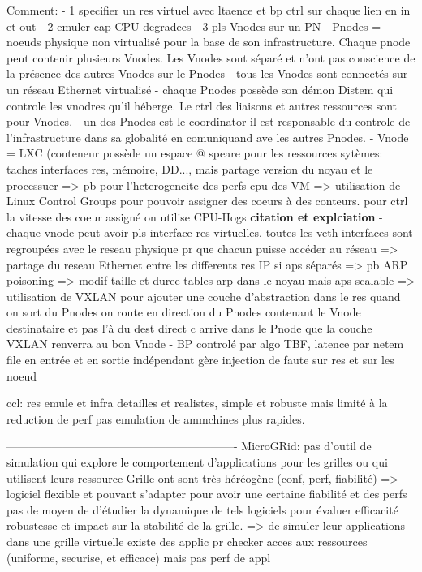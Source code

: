 Comment:
- 1 specifier un res virtuel avec ltaence et bp ctrl sur chaque lien en in et out
- 2 emuler cap CPU degradees
- 3 pls Vnodes sur un PN
- Pnodes = noeuds physique non virtualisé pour la base de son infrastructure. Chaque pnode peut contenir plusieurs Vnodes. Les Vnodes sont séparé et n'ont pas conscience de la présence des autres Vnodes sur le Pnodes
- tous les Vnodes sont connectés sur un réseau Ethernet virtualisé
- chaque Pnodes possède son démon Distem qui controle les vnodres qu'il héberge. Le ctrl des liaisons et autres ressources sont pour Vnodes.
- un des Pnodes est le coordinator il est responsable du controle de l'infrastructure dans sa globalité en comuniquand ave les autres Pnodes.
- Vnode = LXC (conteneur possède un espace @ speare pour les ressources sytèmes: taches interfaces res, mémoire, DD..., mais partage version du noyau et le processuer => pb pour l'heterogeneite des perfs cpu des VM => utilisation de Linux Control Groups pour pouvoir assigner des coeurs à des conteurs. pour ctrl la vitesse des coeur assigné on utilise CPU-Hogs \textbf{citation et explciation}
- chaque vnode peut avoir pls interface res virtuelles. toutes les veth interfaces sont regroupées avec le reseau physique pr que chacun puisse accéder au réseau => partage du reseau Ethernet entre les differents res IP si aps séparés => pb ARP poisoning => modif taille et duree tables arp dans le noyau mais aps scalable => utilisation de VXLAN pour ajouter une couche d'abstraction dans le res quand on sort du Pnodes on route en direction du Pnodes contenant le Vnode destinataire et pas l'à du dest direct c arrive dans le Pnode que la couche VXLAN renverra au bon Vnode
- BP controlé par algo TBF, latence par netem file en entrée et en sortie indépendant
gère injection de faute sur res et sur les noeud

ccl:
res emule et infra detailles et realistes, simple et robuste mais limité à la reduction de perf pas emulation de ammchines plus rapides.


-------------------------------------------------------------
MicroGRid:
pas d'outil de simulation qui explore le comportement d'applications pour les grilles ou qui utilisent leurs ressource
Grille ont sont très héréogène (conf, perf, fiabilité) => logiciel flexible et pouvant s'adapter pour avoir une certaine fiabilité et des perfs
pas de moyen de d'étudier la dynamique de tels logiciels pour évaluer efficacité robustesse et impact sur la stabilité de la grille.
=> de simuler leur applications dans une grille virtuelle
existe des applic pr checker acces aux ressources (uniforme, securise, et efficace) mais pas perf de appl


